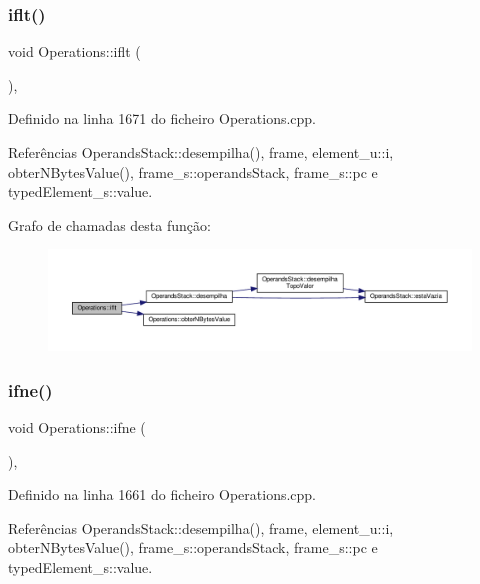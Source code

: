 \subsubsection{\texorpdfstring{iflt()}{iflt()}}
{\footnotesize\ttfamily void Operations\+::iflt (\begin{DoxyParamCaption}{ }\end{DoxyParamCaption})\hspace{0.3cm}{\ttfamily [static]}, {\ttfamily [private]}}



Definido na linha 1671 do ficheiro Operations.\+cpp.



Referências Operands\+Stack\+::desempilha(), frame, element\+\_\+u\+::i, obter\+N\+Bytes\+Value(), frame\+\_\+s\+::operands\+Stack, frame\+\_\+s\+::pc e typed\+Element\+\_\+s\+::value.

Grafo de chamadas desta função\+:\nopagebreak
\begin{figure}[H]
\begin{center}
\leavevmode
\includegraphics[width=350pt]{classOperations_a0a9460ea938fc3a9bbd2102578d50ee2_cgraph}
\end{center}
\end{figure}
\mbox{\label{classOperations_aaadc2a6aaf1d3be06e918930622dad29}} 
\subsubsection{\texorpdfstring{ifne()}{ifne()}}
{\footnotesize\ttfamily void Operations\+::ifne (\begin{DoxyParamCaption}{ }\end{DoxyParamCaption})\hspace{0.3cm}{\ttfamily [static]}, {\ttfamily [private]}}



Definido na linha 1661 do ficheiro Operations.\+cpp.



Referências Operands\+Stack\+::desempilha(), frame, element\+\_\+u\+::i, obter\+N\+Bytes\+Value(), frame\+\_\+s\+::operands\+Stack, frame\+\_\+s\+::pc e typed\+Element\+\_\+s\+::value.

